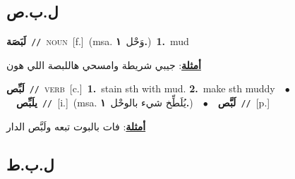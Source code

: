 \documentclass[10pt,a4paper,twoside]{article} %
\begin{document}
\begin{multicols}{2}
{{{{{{{{{\vspace{-3mm}
\subsection*{\color{blue}\foreignlanguage{arabic}{ل.ب.ص}\color{blue}{}} 

{\setlength\topsep{0pt}\textbf{\foreignlanguage{arabic}{لَبَصَة}}\ {\color{gray}\texttt{//}\color{black}}\ \textsc{noun}\ [f.]\ \color{gray}(msa. \foreignlanguage{arabic}{وَحْل}~\foreignlanguage{arabic}{\textbf{١.}})\color{black}\ \textbf{1.}~mud\  \begin{flushright}\color{gray}\foreignlanguage{arabic}{\textbf{\underline{\foreignlanguage{arabic}{أمثلة}}}: جيبي شريطة وامسحي هاللبصة اللي هون}\end{flushright}\color{black}} \vspace{2mm}

{\setlength\topsep{0pt}\textbf{\foreignlanguage{arabic}{لَبِّص}}\ {\color{gray}\texttt{//}\color{black}}\ \textsc{verb}\ [c.]\ \textbf{1.}~stain sth with mud.  \textbf{2.}~make sth muddy\ \ $\bullet$\ \ \setlength\topsep{0pt}\textbf{\foreignlanguage{arabic}{يلَبِّص}}\ {\color{gray}\texttt{//}\color{black}}\ [i.]\ \color{gray}(msa. \foreignlanguage{arabic}{يُلَطِّخ شيء بالوحْل}~\foreignlanguage{arabic}{\textbf{١.}})\color{black}\ \ $\bullet$\ \ \setlength\topsep{0pt}\textbf{\foreignlanguage{arabic}{لَبَّص}}\ {\color{gray}\texttt{//}\color{black}}\ [p.]\  \begin{flushright}\color{gray}\foreignlanguage{arabic}{\textbf{\underline{\foreignlanguage{arabic}{أمثلة}}}: فات بالبوت تبعه ولَبَّص الدار}\end{flushright}\color{black}} \vspace{2mm}

\vspace{-3mm}
\subsection*{\color{blue}\foreignlanguage{arabic}{ل.ب.ط}\color{blue}{}} 

}}}}}}}}}
\end{multicols}
\end{document}
